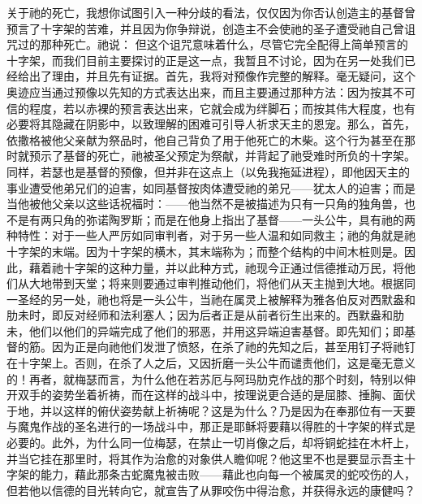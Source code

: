 关于祂的死亡，我想你试图引入一种分歧的看法，仅仅因为你否认创造主的基督曾预言了十字架的苦难，并且因为你争辩说，创造主不会使祂的圣子遭受祂自己曾诅咒过的那种死亡。祂说： 但这个诅咒意味着什么，尽管它完全配得上简单预言的十字架，而我们目前主要探讨的正是这一点，我暂且不讨论，因为在另一处我们已经给出了理由，并且先有证据。首先，我将对预像作完整的解释。毫无疑问，这个奥迹应当通过预像以先知的方式表达出来，而且主要通过那种方法：因为按其不可信的程度，若以赤裸的预言表达出来，它就会成为绊脚石；而按其伟大程度，也有必要将其隐藏在阴影中，以致理解的困难可引导人祈求天主的恩宠。那么，首先，依撒格被他父亲献为祭品时，他自己背负了用于他死亡的木柴。这个行为甚至在那时就预示了基督的死亡，祂被圣父预定为祭献，并背起了祂受难时所负的十字架。同样，若瑟也是基督的预像，但并非在这点上（以免我拖延进程），即他因天主的事业遭受他弟兄们的迫害，如同基督按肉体遭受祂的弟兄——犹太人的迫害；而是当他被他父亲以这些话祝福时：——他当然不是被描述为只有一只角的独角兽，也不是有两只角的弥诺陶罗斯；而是在他身上指出了基督——一头公牛，具有祂的两种特性：对于一些人严厉如同审判者，对于另一些人温和如同救主；祂的角就是祂十字架的末端。因为十字架的横木，其末端称为；而整个结构的中间木桩则是。因此，藉着祂十字架的这种力量，并以此种方式，祂现今正通过信德推动万民，将他们从大地带到天堂；将来则要通过审判推动他们，将他们从天主抛到大地。根据同一圣经的另一处，祂也将是一头公牛，当祂在属灵上被解释为雅各伯反对西默盎和肋未时，即反对经师和法利塞人；因为后者正是从前者衍生出来的。西默盎和肋未，他们以他们的异端完成了他们的邪恶，并用这异端迫害基督。即先知们；即基督的筋。因为正是向祂他们发泄了愤怒，在杀了祂的先知之后，甚至用钉子将祂钉在十字架上。否则，在杀了人之后，又因折磨一头公牛而谴责他们，这是毫无意义的！再者，就梅瑟而言，为什么他在若苏厄与阿玛肋克作战的那个时刻，特别以伸开双手的姿势坐着祈祷，而在这样的战斗中，按理说更合适的是屈膝、捶胸、面伏于地，并以这样的俯伏姿势献上祈祷呢？这是为什么？乃是因为在奉那位有一天要与魔鬼作战的圣名进行的一场战斗中，那正是耶稣将要藉以得胜的十字架的样式是必要的。此外，为什么同一位梅瑟，在禁止一切肖像之后，却将铜蛇挂在木杆上，并当它挂在那里时，将其作为治愈的对象供人瞻仰呢？他这里不也是要显示吾主十字架的能力，藉此那条古蛇魔鬼被击败——藉此也向每一个被属灵的蛇咬伤的人，但若他以信德的目光转向它，就宣告了从罪咬伤中得治愈，并获得永远的康健吗？\par

